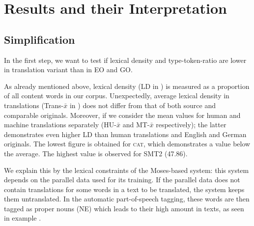 \documentclass[output=paper]{LSP/langsci}
\begin{document}
\section{Results and their Interpretation} \label{sec:4:4} 
\subsection{Simplification}
In the first step, we want to test if lexical density and type-token-ratio are lower in translation variant than in EO and GO.


     \begin{table}
     \centering
 \caption{\textsc{st}TR and LD in \textsc{vartra}-\textsc{small}}
     \label{tab:4.2}
\end{table}


As already mentioned above, lexical density (LD in ) is measured as a proportion of all content words in our corpus. Unexpectedly, average lexical density in translations (Trans-$\bar{x}$ in ) does not differ from that of both source and comparable originals. Moreover, if we consider the mean values for human and machine translations separately (HU-$\bar{x}$ and MT-$\bar{x}$ respectively); the latter demonstrates even higher LD than human translations and English and German originals. The lowest figure is obtained for \textsc{cat}, which demonstrates a value below the average. The highest value is observed for SMT2 (47.86).

We explain this by the lexical constraints of the Moses-based system: this system depends on the parallel data used for its training.  If the parallel data does not contain translations for some words in a text to be translated, the system keeps them untranslated. In the automatic part-of-speech tagging, these words are then tagged as proper nouns (NE) which leads to their high amount in texts, as seen in example .
\end{document}
